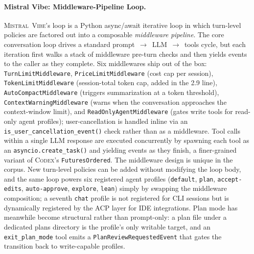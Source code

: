 \documentclass[11pt,a4paper]{article}
\newcommand{\cdx}{\textsc{Codex}\xspace}
\newcommand{\vibe}{\textsc{Mistral~Vibe}\xspace}
\begin{document}
\paragraph{Mistral Vibe: Middleware-Pipeline Loop.}
\vibe{}'s loop is a Python async/await iterative loop in which turn-level policies are factored out into a composable \emph{middleware pipeline}.
The core conversation loop drives a standard prompt~$\to$~LLM~$\to$~tools cycle, but each iteration first walks a stack of middleware pre-turn checks and then yields events to the caller as they complete.
Six middlewares ship out of the box: \texttt{TurnLimitMiddleware}, \texttt{PriceLimitMiddleware} (cost cap per session), \texttt{TokenLimitMiddleware} (session-total token cap, added in the 2.9 line), \texttt{AutoCompactMiddleware} (triggers summarization at a token threshold), \texttt{ContextWarningMiddleware} (warns when the conversation approaches the context-window limit), and \texttt{ReadOnlyAgentMiddleware} (gates write tools for read-only agent profiles); user-cancellation is handled inline via an \texttt{is\_user\_cancellation\_event()} check rather than as a middleware.
Tool calls within a single LLM response are executed concurrently by spawning each tool as an \texttt{asyncio.create\_task()} and yielding events as they finish, a finer-grained variant of \cdx{}'s \texttt{FuturesOrdered}.
The middleware design is unique in the corpus.
New turn-level policies can be added without modifying the loop body, and the same loop powers six registered agent profiles (\texttt{default}, \texttt{plan}, \texttt{accept-edits}, \texttt{auto-approve}, \texttt{explore}, \texttt{lean}) simply by swapping the middleware composition; a seventh \texttt{chat} profile is not registered for CLI sessions but is dynamically registered by the ACP layer for IDE integrations.
Plan mode has meanwhile become structural rather than prompt-only: a plan file under a dedicated plans directory is the profile's only writable target, and an \texttt{exit\_plan\_mode} tool emits a \texttt{PlanReviewRequestedEvent} that gates the transition back to write-capable profiles.
\end{document}
